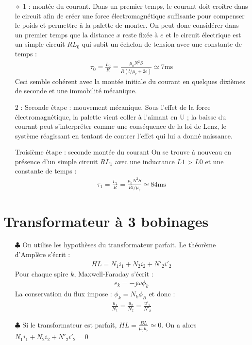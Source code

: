 \documentclass{report}
\begin{document}
\begin{itemize}
	\item[$\diamond$] 1 : montée du courant. Dans un premier temps, le courant doit croître dans le circuit afin de créer une force électromagnétique suffisante pour compenser le poids et permettre à la palette de monter.
On peut donc considérer dans un premier temps que la distance $x$ reste fixée à $e$ et le circuit électrique est un simple circuit $RL_0$ qui subit un échelon de tension avec une constante de temps :
\begin{align*}
	\tau_0=\frac{L_0}{R}=\frac{\mu_0N^2S}{R(l/\mu_r+2e)}\simeq7\mathrm{ms}
\end{align*}
	Ceci semble cohérent avec la montée initiale du courant en quelques dixièmes de seconde et une immobilité mécanique.
	
2 : Seconde étape : mouvement mécanique. 
Sous l’effet de la force électromagnétique, la palette vient coller à l’aimant en U ; la baisse du courant peut s’interpréter comme une conséquence de la loi de Lenz, le système réagissant en tentant de contrer l’effet qui lui a donné naissance.

Troisième étape : seconde montée du courant
On se trouve à nouveau en présence d’un simple circuit $RL_1$ avec une inductance $L1$ > $L0$ et une constante de temps :
\begin{align*}
	\tau_1=\frac{L_1}{R}=\frac{\mu_0N^2S}{Rl/\mu_r}\simeq84\mathrm{ms}
\end{align*}
\end{itemize}

\section*{Transformateur à 3 bobinages}

\begin{itemize}
	\item[$\clubsuit$] On utilise les hypothèses du transformateur parfait. Le théorème d'Amplère s'écrit :
	\begin{align*}
		HL=N_1i_1+N_2i_2+N'_2i'_2
	\end{align*}
	Pour chaque spire $k$, Maxwell-Faraday s'écrit :
	\begin{align*}
		e_k=-j\omega\phi_{k}
	\end{align*}
	La conservation du flux impose : $\phi_{k}=N_k\phi_B$ et donc :
	\begin{align*}
		\frac{u_1}{N_1}=\frac{u_2}{N_2}=\frac{u'_2}{N'_2}
	\end{align*}	
	
	\item[$\clubsuit$] Si le transformateur est parfait, $HL=\frac{BL}{\mu_0\mu_r}\simeq0$. On a alors $N_1i_1+N_2i_2+N'_2i'_2=0$
	
\end{itemize}
\end{document}
